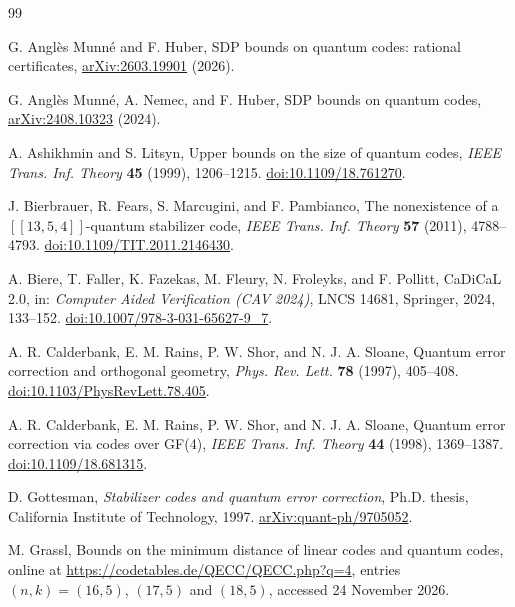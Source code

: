 \documentclass[11pt]{article}
\theoremstyle{definition}
\theoremstyle{remark}
\newcommand{\qc}[1]{[\![#1]\!]}
\begin{document}
\begin{thebibliography}{99}

G. Angl\`es Munn\'e and F. Huber,
SDP bounds on quantum codes: rational certificates,
\href{https://arxiv.org/abs/2603.19901}{arXiv:2603.19901} (2026).

G. Angl\`es Munn\'e, A. Nemec, and F. Huber,
SDP bounds on quantum codes,
\href{https://arxiv.org/abs/2408.10323}{arXiv:2408.10323} (2024).

A. Ashikhmin and S. Litsyn,
Upper bounds on the size of quantum codes,
\emph{IEEE Trans. Inf. Theory} \textbf{45} (1999), 1206--1215.
\href{https://doi.org/10.1109/18.761270}{doi:10.1109/18.761270}.

J. Bierbrauer, R. Fears, S. Marcugini, and F. Pambianco,
The nonexistence of a \(\qc{13,5,4}\)-quantum stabilizer code,
\emph{IEEE Trans. Inf. Theory} \textbf{57} (2011), 4788--4793.
\href{https://doi.org/10.1109/TIT.2011.2146430}{doi:10.1109/TIT.2011.2146430}.

A. Biere, T. Faller, K. Fazekas, M. Fleury, N. Froleyks, and F. Pollitt,
CaDiCaL 2.0, in: \emph{Computer Aided Verification (CAV 2024)},
LNCS 14681, Springer, 2024, 133--152.
\href{https://doi.org/10.1007/978-3-031-65627-9_7}{doi:10.1007/978-3-031-65627-9\_7}.

A. R. Calderbank, E. M. Rains, P. W. Shor, and N. J. A. Sloane,
Quantum error correction and orthogonal geometry,
\emph{Phys. Rev. Lett.} \textbf{78} (1997), 405--408.
\href{https://doi.org/10.1103/PhysRevLett.78.405}{doi:10.1103/PhysRevLett.78.405}.

A. R. Calderbank, E. M. Rains, P. W. Shor, and N. J. A. Sloane,
Quantum error correction via codes over GF(4),
\emph{IEEE Trans. Inf. Theory} \textbf{44} (1998), 1369--1387.
\href{https://doi.org/10.1109/18.681315}{doi:10.1109/18.681315}.

D. Gottesman, \emph{Stabilizer codes and quantum error correction},
Ph.D. thesis, California Institute of Technology, 1997.
\href{https://arxiv.org/abs/quant-ph/9705052}{arXiv:quant-ph/9705052}.

M. Grassl, Bounds on the minimum distance of linear codes and quantum
codes, online at \url{https://codetables.de/QECC/QECC.php?q=4}, entries
\((n,k)=(16,5)\), \((17,5)\) and \((18,5)\), accessed 24 November 2026.


\end{thebibliography}
\end{document}
